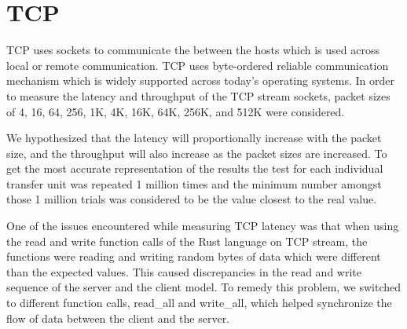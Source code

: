\section{TCP}
TCP uses sockets to communicate the between the hosts which is used across local or remote communication. TCP uses byte-ordered reliable communication mechanism which is widely supported across today's operating systems. In order to measure the latency and throughput of the TCP stream sockets, packet sizes of 4, 16, 64, 256, 1K, 4K, 16K, 64K, 256K, and 512K were considered.

We hypothesized that the latency will proportionally increase with the packet size, and the throughput will also increase as the packet sizes are increased. To get the most accurate representation of the results the test for each individual transfer unit was repeated 1 million times and the minimum number amongst those 1 million trials was considered to be the value closest to the real value.

One of the issues encountered while measuring TCP latency was that when using the read and write function calls of the Rust language on TCP stream, the functions were reading and writing random bytes of data which were different than the expected values. This caused discrepancies in the read and write sequence of the server and the client model. To remedy this problem, we switched to different function calls, read_all and write_all, which helped synchronize the flow of data between the client and the server.



